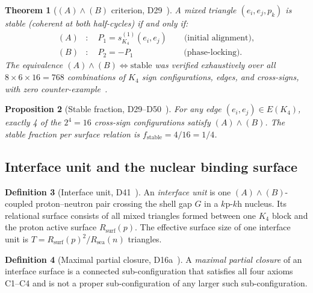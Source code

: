 \documentclass[11pt,a4paper]{article}
\newtheorem{theorem}{Theorem}[section]
\newtheorem{proposition}[theorem]{Proposition}
\theoremstyle{definition}
\newtheorem{definition}[theorem]{Definition}
\theoremstyle{remark}
\newcommand{\Kfour}{K_4}
\newcommand{\Rsurf}{R_{\mathrm{surf}}}
\newcommand{\Rsea}{R_{\mathrm{sea}}}
\newcommand{\Tpdl}{T}
\newcommand{\kph}{k\text{p-}k\text{h}}
\begin{document}
\begin{theorem}[$(A)\wedge(B)$ criterion, D29~\cite{PDL_D29}]
\label{thm:AB}
A mixed triangle $(e_i, e_j, p_k)$ is stable (coherent at both half-cycles) if and only if:
\begin{align}
  (A) &:\quad P_1 = s_{\Kfour}^{(1)}(e_i, e_j) \qquad \text{(initial alignment)}, \label{eq:A} \\
  (B) &:\quad P_2 = -P_1 \qquad\qquad\qquad \text{(phase-locking)}. \label{eq:B}
\end{align}
The equivalence $(A)\wedge(B) \Leftrightarrow \text{stable}$ was verified exhaustively over all $8 \times 6 \times 16 = 768$ combinations of $\Kfour$ sign configurations, edges, and cross-signs, with zero counter-example~\cite{PDL_D29}.
\end{theorem}

\begin{proposition}[Stable fraction, D29--D50~\cite{PDL_D29,PDL_D50}]
\label{prop:fraction}
For any edge $(e_i, e_j) \in E(\Kfour)$, exactly 4 of the $2^4 = 16$ cross-sign configurations satisfy $(A)\wedge(B)$. The stable fraction per surface relation is $f_{\mathrm{stable}} = 4/16 = 1/4$.
\end{proposition}

\subsection{Interface unit and the nuclear binding surface}

\begin{definition}[Interface unit, D41~\cite{PDL_D41}]
\label{def:unit}
An \emph{interface unit} is one $(A)\wedge(B)$-coupled proton--neutron pair crossing the shell gap $G$ in a $\kph$ nucleus. Its relational surface consists of all mixed triangles formed between one $\Kfour$ block and the proton active surface $\Rsurf(p)$. The effective surface size of one interface unit is $\Tpdl = \Rsurf(p)^2/\Rsea(n)$ triangles.
\end{definition}

\begin{definition}[Maximal partial closure, D16a~\cite{PDL_D16a}]
\label{def:maxclos}
A \emph{maximal partial closure} of an interface surface is a connected sub-configuration that satisfies all four axioms C1--C4 and is not a proper sub-configuration of any larger such sub-configuration.
\end{definition}

\end{document}
